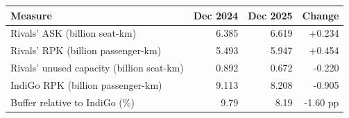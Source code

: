 \begin{tabularx}{\linewidth}{|>{\raggedright\arraybackslash}X|r|r|r|}
\hline
\textbf{Measure} & \textbf{Dec 2024} & \textbf{Dec 2025} & \textbf{Change} \\
\hline
Rivals' ASK (billion seat-km) & 6.385 & 6.619 & +0.234 \\
\hline
Rivals' RPK (billion passenger-km) & 5.493 & 5.947 & +0.454 \\
\hline
Rivals' unused capacity (billion seat-km) & 0.892 & 0.672 & -0.220 \\
\hline
IndiGo RPK (billion passenger-km) & 9.113 & 8.208 & -0.905 \\
\hline
Buffer relative to IndiGo (\%) & 9.79 & 8.19 & -1.60 pp \\
\hline
\end{tabularx}
